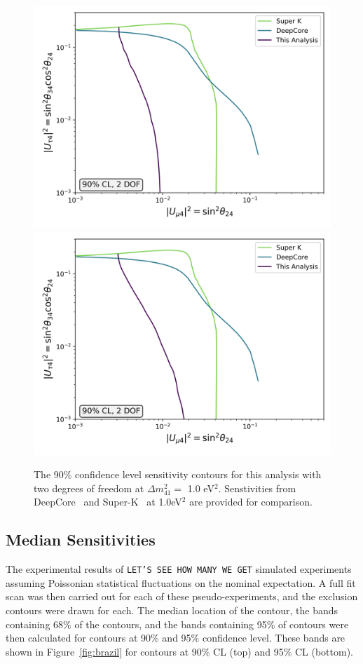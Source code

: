 \documentclass[main.tex]{subfiles}
\begin{document}
\begin{figure}
    \centering
    \includegraphics[width=0.45\linewidth]{figures/comparison.png}%
    \includegraphics[width=0.45\linewidth]{figures/comparison_updated.png}
    \caption{The 90\% confidence level sensitivity contours for this analysis with two degrees of freedom at $\Delta m_{41}^{2}=$ 1.0 eV$^{2}$. Senstivities from DeepCore~\cite{Aartsen_2017_dc} and Super-K~\cite{PhysRevD.91.052019} at 1.0eV$^{2}$ are provided for comparison.}\label{fig:experiment_compare}
\end{figure}


\subsection{Median Sensitivities}

The experimental results of \texttt{LET'S SEE HOW MANY WE GET} simulated experiments assuming Poissonian statistical fluctuations on the nominal expectation.
A full fit scan was then carried out for each of these pseudo-experiments, and the exclusion contours were drawn for each.
The median location of the contour, the bands containing 68\% of the contours, and the bands containing 95\% of contours were then calculated for contours at 90\% and 95\% confidence level. 
These bands are shown in Figure~\ref{fig:brazil} for contours at 90\% CL (top) and 95\% CL (bottom).
\end{document}
